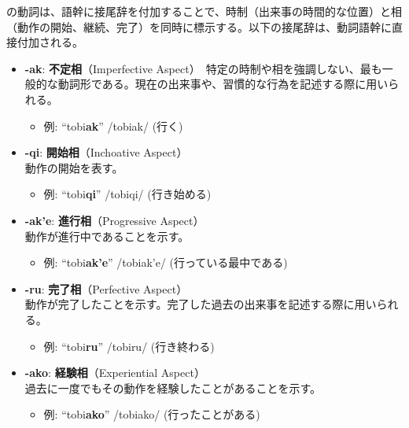 \langname の動詞は、語幹に接尾辞を付加することで、時制（出来事の時間的な位置）と相（動作の開始、継続、完了）を同時に標示する。以下の接尾辞は、動詞語幹に直接付加される。

\begin{itemize}
\item \textbf{-ak}: \textbf{不定相}（Imperfective Aspect）\
特定の時制や相を強調しない、最も一般的な動詞形である。現在の出来事や、習慣的な行為を記述する際に用いられる。
\begin{itemize}
\item 例: ``tobi\textbf{ak}'' /tobiak/ (行く)
\end{itemize}

\item \textbf{-qi}: \textbf{開始相}（Inchoative Aspect）\\
動作の開始を表す。
\begin{itemize}
    \item 例: ``tobi\textbf{qi}'' /tobiqi/ (行き始める)
\end{itemize}

\item \textbf{-ak'e}: \textbf{進行相}（Progressive Aspect）\\
動作が進行中であることを示す。
\begin{itemize}
    \item 例: ``tobi\textbf{ak'e}'' /tobiak'e/ (行っている最中である)
\end{itemize}

\item \textbf{-ru}: \textbf{完了相}（Perfective Aspect）\\
動作が完了したことを示す。完了した過去の出来事を記述する際に用いられる。
\begin{itemize}
    \item 例: ``tobi\textbf{ru}'' /tobiru/ (行き終わる)
\end{itemize}

\item \textbf{-ako}: \textbf{経験相}（Experiential Aspect）\\
過去に一度でもその動作を経験したことがあることを示す。
\begin{itemize}
    \item 例: ``tobi\textbf{ako}'' /tobiako/ (行ったことがある)
\end{itemize}

\end{itemize}